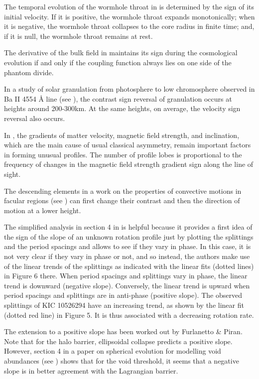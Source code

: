\documentclass[11pt]{book}
\begin{document}
The temporal evolution of the wormhole throat in \cite{bejarano2007thin}
is determined by the sign of its initial velocity. If it is positive,
the wormhole throat expands monotonically; when it is negative, the
wormhole throat collapses to the core radius in finite time; and,
if it is null, the wormhole throat remains at rest.

The derivative of the bulk field in \cite{setare2009braneworld} maintains
its sign during the cosmological evolution if and only if the coupling
function always lies on one side of the phantom divide.

In a study of solar granulation from photosphere to low
chromosphere observed in Ba II 4554 Å line (see \cite{kostik2009solar}), the contrast sign reversal of granulation occurs at heights around 200-300km. At the same heights, on average,
the velocity sign reversal also occurs.

In \cite{sheminova2009origin}, the gradients of matter velocity,
magnetic field strength, and inclination, which are the main cause
of usual classical asymmetry, remain important factors in forming
unusual profiles. The number of profile lobes is proportional to the
frequency of changes in the magnetic field strength gradient sign
along the line of sight.

The descending elements in a work on the properties of convective motions in facular regions (see \cite{kostik2012properties}) can first
change their contrast and then the direction of motion at a lower
height.

The simplified analysis in section 4 in \cite{triana2015internal}
is helpful because it provides a first idea of the sign of the slope
of an unknown rotation profile just by plotting the splittings and
the period spacings and allows to see if they vary in phase. In this
case, it is not very clear if they vary in phase or not, and so instead,
the authors make use of the linear trends of the splittings as indicated
with the linear fits (dotted lines) in Figure 6 there. When period
spacings and splittings vary in phase, the linear trend is downward
(negative slope). Conversely, the linear trend is upward when period
spacings and splittings are in anti-phase (positive slope). The observed
splittings of KIC 10526294 have an increasing trend, as shown by the
linear fit (dotted red line) in Figure 5. It is thus associated with
a decreasing rotation rate.

The extension to a positive slope has been worked out by Furlanetto
\& Piran. Note that for the halo barrier, ellipsoidal collapse predicts
a positive slope. However, section 4 in a paper on spherical evolution
for modelling void abundances (see \cite{achitouv2015testing})
shows that for the void threshold, it seems that a negative slope
is in better agreement with the Lagrangian barrier.
\end{document}
